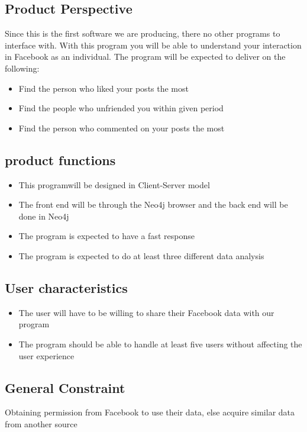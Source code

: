 \documentclass[11pt]{article}
\begin{document}
\subsection{Product Perspective }
Since this is the first software we are producing, there no other programs to interface with. With this program you will be able to understand your interaction in Facebook as an individual. 
The program will be expected to deliver on the following:
\begin{itemize}
\item Find the person who liked your posts the most
\item Find the people who unfriended you within given period
\item Find the person who commented on your posts the most
\end{itemize}

\subsection{product functions}
\begin{itemize}
\item This programwill be designed in Client-Server model
\item The front end will  be through the Neo4j browser and the back end will be done in Neo4j
\item The program is expected to have a fast response 
\item The program is expected to do at least three different data analysis
\end{itemize}

\subsection{User characteristics}
\begin{itemize}
\item The user will have to be willing to share their Facebook data with our program
\item The program should be able to handle at least five users without affecting the user experience
\end{itemize}

\subsection{General Constraint}
Obtaining permission from Facebook to use their data, else acquire similar data from another source
\end{document}
